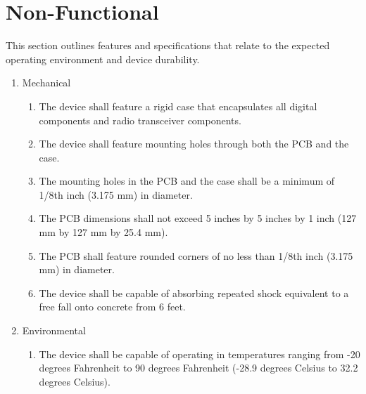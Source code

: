 \documentclass[twoside]{article}
\begin{document}


\section{Non-Functional}
This section outlines features and specifications that relate to the expected operating environment and device durability.
\begin{enumerate}



\item Mechanical
  \begin{enumerate}

  \item The device shall feature a rigid case that encapsulates all digital components and radio transceiver components.
  
  \item The device shall feature mounting holes through both the PCB and the case.

  \item The mounting holes in the PCB and the case shall be a minimum of 1/8th inch (3.175 mm) in diameter.

  \item The PCB dimensions shall not exceed 5 inches by 5 inches by 1 inch (127 mm by 127 mm by 25.4 mm).

  \item The PCB shall feature rounded corners of no less than 1/8th inch (3.175 mm) in diameter.

  \item The device shall be capable of absorbing repeated shock equivalent to a free fall onto concrete from 6 feet.

  \end{enumerate}



\item Environmental
  \begin{enumerate}

  \item The device shall be capable of operating in temperatures ranging from -20 degrees Fahrenheit to 90 degrees Fahrenheit (-28.9 degrees Celsius to 32.2 degrees Celsius).


\end{enumerate}
\end{enumerate}
\end{document}
